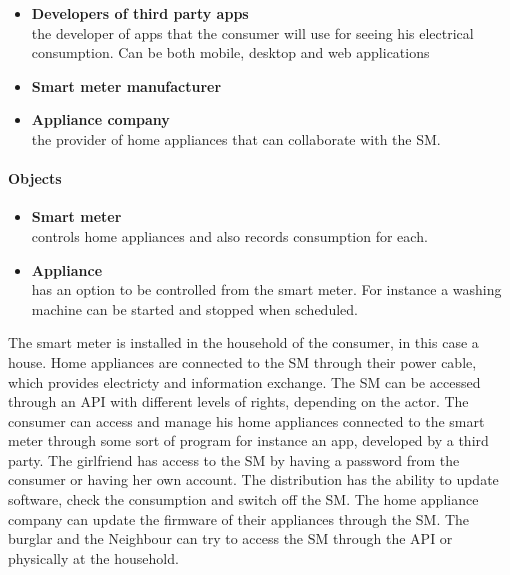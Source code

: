 \begin{itemize}
\item \textbf{Developers of third party apps}\\
the developer of apps that the consumer will use for seeing his electrical consumption. Can be both mobile, desktop and web applications
\item \textbf{Smart meter manufacturer}\\
\item \textbf{Appliance company}\\ the provider of home appliances that can collaborate with the SM.
\end{itemize}

\paragraph{Objects}
\begin{itemize}
\item \textbf{Smart meter}\\ controls home appliances and also records consumption for each.
\item \textbf{Appliance}\\ has an option to be controlled from the smart meter. For instance a washing machine can be started and stopped when scheduled.
\end{itemize}

The smart meter is installed in the household of the consumer, in this case a house.
Home appliances are connected to the SM through their power cable, which provides electricty and information exchange.
The SM can be accessed through an API with different levels of rights, depending on the actor.
The consumer can access and manage his home appliances connected to the smart meter through some sort of program for instance an app, developed by a third party.
The girlfriend has access to the SM by having a password from the consumer or having her own account.
The distribution has the ability to update software, check the consumption and switch off the SM.
The home appliance company can update the firmware of their appliances through the SM.
The burglar and the Neighbour can try to access the SM through the API or physically at the household.

